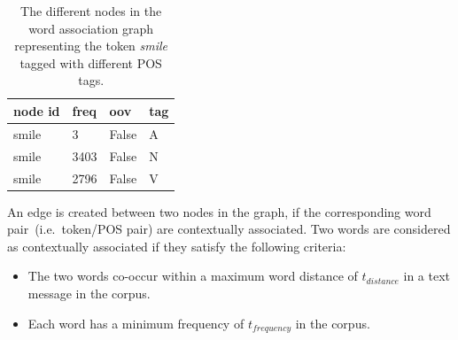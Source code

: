 \documentclass[a4paper,onesided,12pt]{report}
\begin{document}
\begin{table}[hbt]
  \caption{The different nodes in the word association graph representing the token \textit{smile} tagged with different POS tags.}
  \centering
  \begin{tabular}[tc]{|l|l|l|l|}
    \hline

    \textbf{node id} & \textbf{freq} & \textbf{oov} & \textbf{tag} \\
    \hline
    smile & 3 & False & A \\  \hline
    smile & 3403 & False & N \\ \hline
    smile & 2796 & False & V \\ \hline
  \end{tabular}
\label{tab:nodes}
\end{table}

An edge is created between two nodes in the graph, if the corresponding word pair~(i.e.~token/POS pair) are contextually associated. Two words are considered as contextually associated if they satisfy the following criteria:

\begin{itemize}
\item The two words co-occur within a maximum word distance of $t_{distance}$ in a text message in the corpus.
\item Each word has a minimum frequency of $t_{frequency}$ in the corpus.
\end{itemize}
\end{document}
